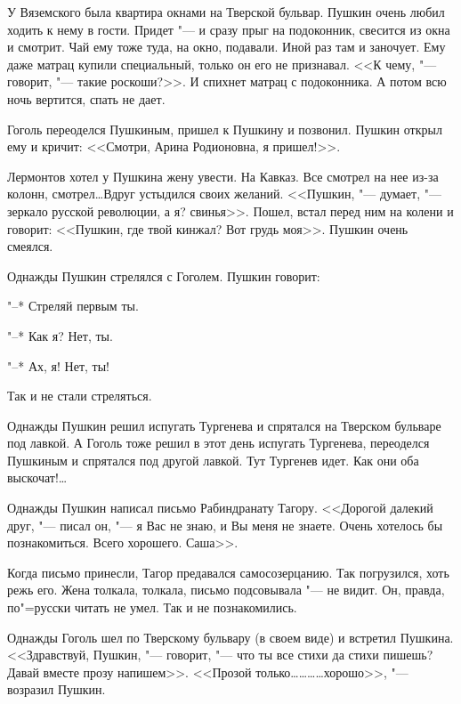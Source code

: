 У Вяземского была квартира окнами на Тверской бульвар. Пушкин очень любил ходить
к нему в гости. Придет "--- и сразу прыг на подоконник, свесится из окна и 
смотрит. Чай ему тоже туда, на окно, подавали. Иной раз там и заночует. Ему 
даже матрац купили специальный, только он его не признавал. <<К чему, "--- 
говорит, "--- такие роскоши?>>. И спихнет матрац с подоконника. А потом всю 
ночь вертится, спать не дает.

Гоголь переоделся Пушкиным, пришел к Пушкину и позвонил. Пушкин открыл ему и 
кричит: <<Смотри, Арина Родионовна, я пришел!>>.

Лермонтов хотел у Пушкина жену увести. На Кавказ. Все смотрел на нее из-за
колонн, смотрел\dots Вдруг устыдился своих желаний. <<Пушкин, "--- думает, "---
зеркало русской революции, а я? свинья>>. Пошел, встал перед ним на колени и 
говорит: <<Пушкин, где твой кинжал? Вот грудь моя>>. Пушкин очень смеялся.

Однажды Пушкин стрелялся с Гоголем. Пушкин говорит:

"--* Стреляй первым ты.

"--* Как я? Нет, ты.

"--* Ах, я! Нет, ты!

Так и не стали стреляться.

Однажды Пушкин решил испугать Тургенева и спрятался на Тверском бульваре под 
лавкой. А Гоголь тоже решил в этот день испугать Тургенева, переоделся Пушкиным 
и спрятался под другой лавкой. Тут Тургенев идет. Как они оба выскочат!\dots

Однажды Пушкин написал письмо Рабиндранату Тагору. <<Дорогой далекий друг, "---
писал он, "--- я Вас не знаю, и Вы меня не знаете. Очень хотелось бы 
познакомиться. Всего хорошего. Саша>>.

Когда письмо принесли, Тагор предавался самосозерцанию. Так погрузился, хоть 
режь его. Жена толкала, толкала, письмо подсовывала "--- не видит. Он, правда, 
по"=русски читать не умел. Так и не познакомились.

Однажды Гоголь шел по Тверскому бульвару (в своем виде) и встретил Пушкина. 
<<Здравствуй, Пушкин, "--- говорит, "--- что ты все стихи да стихи пишешь? Давай
вместе прозу напишем>>. <<Прозой только\dots\dots\dots\dots хорошо>>, "--- 
возразил Пушкин.